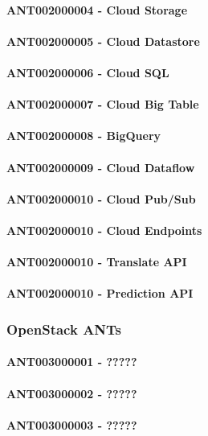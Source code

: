 \documentclass{acm_proc_article-sp}
\begin{document}
\paragraph{ANT002000004 - Cloud Storage}
\paragraph{ANT002000005 - Cloud Datastore}
\paragraph{ANT002000006 - Cloud SQL}
\paragraph{ANT002000007 - Cloud Big Table}
\paragraph{ANT002000008 - BigQuery}
\paragraph{ANT002000009 - Cloud Dataflow}
\paragraph{ANT002000010 - Cloud Pub/Sub}
\paragraph{ANT002000010 - Cloud Endpoints}
\paragraph{ANT002000010 - Translate API}
\paragraph{ANT002000010 - Prediction API}
\subsubsection{OpenStack ANTs}
\paragraph{ANT003000001 - ?????}
\paragraph{ANT003000002 - ?????}
\paragraph{ANT003000003 - ?????}
\end{document}
